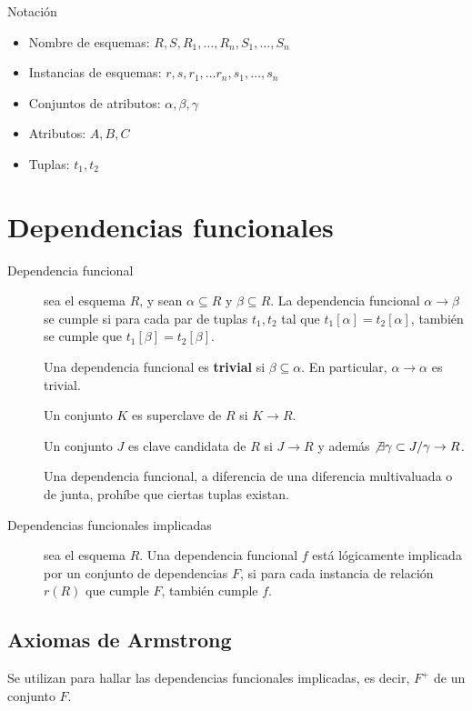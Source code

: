 \documentclass[a4paper, twoside]{article}
\begin{document}
\begin{definicion}[0.9\textwidth]{Notación}
	\begin{itemize}
		\item Nombre de esquemas: $R,S,R_{1},\dots,R_{n},S_{1},\dots,S_{n}$
		\item Instancias de esquemas: $r,s,r_{1},\dots r_{n},s_{1},\dots,s_{n}$
		\item Conjuntos de atributos: $\alpha,\beta,\gamma$
		\item Atributos: $A,B,C$
		\item Tuplas: $t_{1},t_{2}$
	\end{itemize}
\end{definicion}

\section{Dependencias funcionales}
\begin{description}
	\item[Dependencia funcional] sea el esquema $R$, y sean $\alpha \subseteq R$ y $\beta\subseteq R$. La dependencia funcional $\alpha \to \beta$ se cumple si para cada par de tuplas $t_{1}, t_{2}$ tal que $t_{1}[\alpha] = t_{2}[\alpha]$, también se cumple que $t_{1}[\beta]=t_{2}[\beta]$. 

	Una dependencia funcional es \textbf{trivial} si $\beta\subseteq\alpha$. En particular, $\alpha\to\alpha$ es trivial.

	Un conjunto $K$ es superclave de $R$ si $K\to R$.

	Un conjunto $J$ es clave candidata de $R$ si $J\to R$ y además $\not\exists\gamma\subset J/\gamma\to R$.

	Una dependencia funcional, a diferencia de una diferencia multivaluada o de junta, prohíbe que ciertas tuplas existan.

	\item[Dependencias funcionales implicadas] sea el esquema $R$. Una dependencia funcional $f$ está lógicamente implicada por un conjunto de dependencias $F$, si para cada instancia de relación $r(R)$ que cumple $F$, también cumple $f$.
\end{description}

\subsection{Axiomas de Armstrong}
Se utilizan para hallar las dependencias funcionales implicadas, es
decir, $F^{+}$ de un conjunto $F$.
\end{document}
